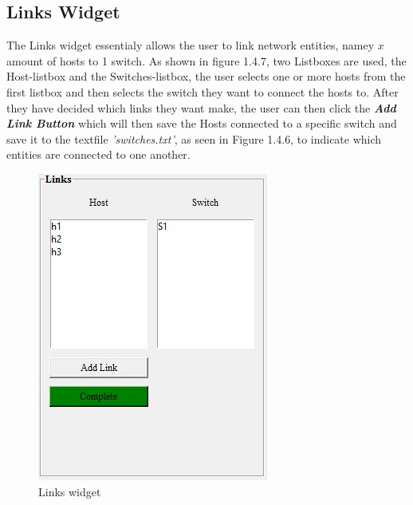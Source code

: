 \subsection{Links Widget}
The Links widget essentialy allows the user to link network entities, namey $x$ amount of hosts to 1 switch. As shown in figure 1.4.7, two Listboxes are used, the Host-listbox and the Switches-listbox, the user selects one or more hosts from the first listbox and then selects the switch they want to connect the hosts to. After they have decided which links they want make, the user can then click the \textbf{\textit{Add Link Button}} which will then save the Hosts connected to a specific switch and save it to the textfile \textit{'switches.txt'}, as seen in Figure 1.4.6, to indicate which entities are connected to one another.
\begin{figure}[H]
    \centering
    \includegraphics[scale=0.7]{Links}
    \caption{Links widget}
\end{figure}\newpage

